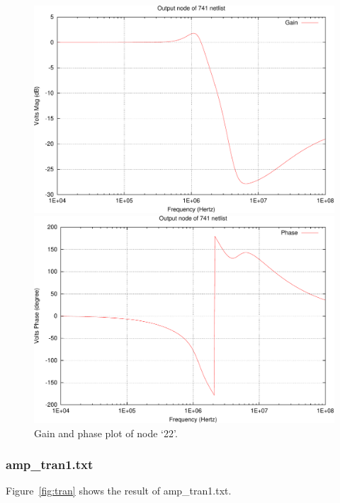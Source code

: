 \documentclass{article}
\begin{document}
\begin{figure}[htbp]
  \centering
    \includegraphics[width=.8\textwidth]{741_amplifier_22_g-crop.pdf}

    \vspace{2em}

    \includegraphics[width=.8\textwidth]{741_amplifier_22_p-crop.pdf}
  \caption{Gain and phase plot of node `22'.}
  \label{fig:741}
\end{figure}

\subsubsection{amp\_tran1.txt}
Figure~\ref{fig:tran} shows the result of amp\_tran1.txt.
\end{document}
